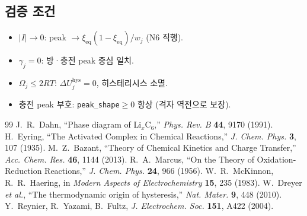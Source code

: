 \documentclass[11pt,a4paper]{article}
\newcommand{\eq}{\mathrm{eq}}
\newcommand{\hys}{\mathrm{hys}}
\begin{document}
\subsection{검증 조건}

\begin{itemize}
\item $|I|\to0$: peak $\to\xi_{\eq}(1-\xi_{\eq})/w_j$ (N6 직행).
\item $\gamma_j=0$: 방·충전 peak 중심 일치.
\item $\Omega_j\le2RT$: $\Delta U_j^\hys=0$, 히스테리시스 소멸.
\item 충전 peak 부호: \texttt{peak\_shape}$\ge0$ 항상 (격자 역전으로 보장).
\end{itemize}

\begin{thebibliography}{99}
 J.~R.~Dahn, ``Phase diagram of Li$_x$C$_6$,''
  \emph{Phys. Rev. B} \textbf{44}, 9170 (1991).
 H.~Eyring, ``The Activated Complex in Chemical Reactions,''
  \emph{J. Chem. Phys.} \textbf{3}, 107 (1935).
 M.~Z.~Bazant, ``Theory of Chemical Kinetics and Charge Transfer,''
  \emph{Acc. Chem. Res.} \textbf{46}, 1144 (2013).
 R.~A.~Marcus, ``On the Theory of Oxidation-Reduction Reactions,''
  \emph{J. Chem. Phys.} \textbf{24}, 966 (1956).
 W.~R.~McKinnon, R.~R.~Haering,
  in \emph{Modern Aspects of Electrochemistry} \textbf{15}, 235 (1983).
 W.~Dreyer \emph{et al.}, ``The thermodynamic origin of hysteresis,''
  \emph{Nat. Mater.} \textbf{9}, 448 (2010).
 Y.~Reynier, R.~Yazami, B.~Fultz,
  \emph{J. Electrochem. Soc.} \textbf{151}, A422 (2004).
\end{thebibliography}
\end{document}
